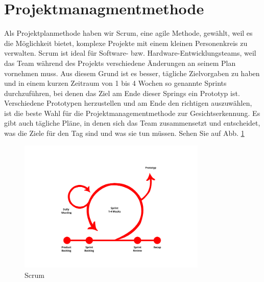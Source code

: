 \section{Projektmanagmentmethode}
Als Projektplanmethode haben wir Scrum, eine agile Methode, gewählt, weil es die Möglichkeit bietet, komplexe Projekte mit einem kleinen Personenkreis zu verwalten. Scrum ist ideal für Software- bzw. Hardware-Entwicklungsteams, weil das Team während des Projekts verschiedene Änderungen an seinem Plan vornehmen muss. Aus diesem Grund ist es besser, tägliche Zielvorgaben zu haben und in einem kurzen Zeitraum von 1 bis 4 Wochen so genannte Sprints durchzuführen, bei denen das Ziel am Ende dieser Springs ein Prototyp ist. Verschiedene Prototypen herzustellen und am Ende den richtigen auszuwählen, ist die beste Wahl für die Projektmanagementmethode zur Gesichtserkennung. Es gibt auch tägliche Pläne, in denen sich das Team zusammensetzt und entscheidet, was die Ziele für den Tag sind und was sie tun müssen. Sehen Sie auf Abb. \ref{fig:scrum}
\begin{figure}[ht]
	\includegraphics[width=0.8\textwidth]{./figures/scrum.jpg}
	\centering
	\caption{Scrum}
	\label{fig:scrum}
\end{figure}